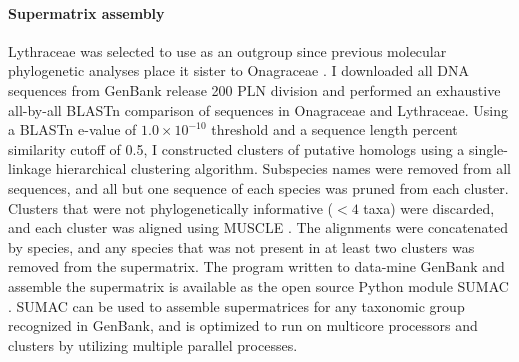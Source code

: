 \documentclass[review]{elsarticle}
\begin{document}
\paragraph{Supermatrix assembly} 

Lythraceae was selected to use as an outgroup since previous molecular phylogenetic analyses
place it sister to Onagraceae \citep{conti1997, Sytsma2004}.
I downloaded all DNA sequences from GenBank release 200 PLN division and
performed an exhaustive all-by-all BLASTn \citep{blast} comparison of sequences in Onagraceae
and Lythraceae.
Using a BLASTn e-value of $1.0 \times 10^{-10}$ threshold and a sequence length
percent similarity cutoff of 0.5,
I constructed clusters of putative homologs using a single-linkage hierarchical clustering algorithm.
Subspecies names were removed from all sequences, and all but one sequence of each species was pruned from each cluster.
Clusters that were not phylogenetically informative ($< 4$ taxa) were discarded,
and each cluster was aligned using MUSCLE \citep{edgar2004muscle}. 
The alignments were concatenated by species, and any species that was not present in at least
two clusters was removed from the supermatrix.
The program written to data-mine GenBank and assemble the supermatrix 
is available as the open source Python module 
SUMAC \citep{sumac}.
SUMAC can be used to assemble
supermatrices for any taxonomic group recognized in GenBank, 
and is optimized to run on multicore processors and clusters by utilizing multiple parallel processes.
\end{document}
